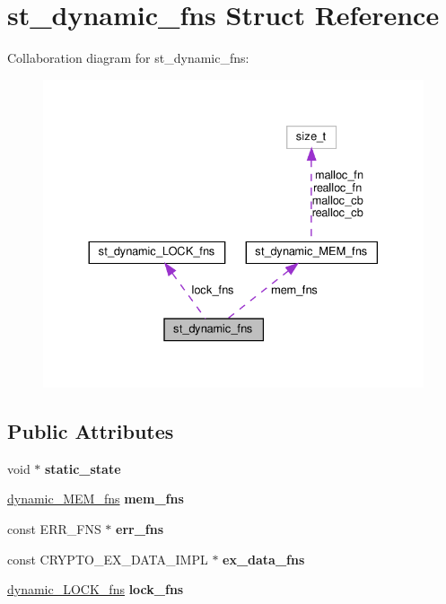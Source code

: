 \hypertarget{structst__dynamic__fns}{}\section{st\+\_\+dynamic\+\_\+fns Struct Reference}
\label{structst__dynamic__fns}


Collaboration diagram for st\+\_\+dynamic\+\_\+fns\+:
\nopagebreak
\begin{figure}[H]
\begin{center}
\leavevmode
\includegraphics[width=330pt]{structst__dynamic__fns__coll__graph}
\end{center}
\end{figure}
\subsection*{Public Attributes}
\begin{DoxyCompactItemize}
\item 
\mbox{\label{structst__dynamic__fns_a929eb1e8f7d7edbc258ee2c258f6fb77}} 
void $\ast$ {\bfseries static\+\_\+state}
\item 
\mbox{\label{structst__dynamic__fns_a337f97c16bdfd0bbe3e4432fa32b29c4}} 
\hyperlink{structst__dynamic__MEM__fns}{dynamic\+\_\+\+M\+E\+M\+\_\+fns} {\bfseries mem\+\_\+fns}
\item 
\mbox{\label{structst__dynamic__fns_a01d513d12727c5a3f86e6b7370476197}} 
const E\+R\+R\+\_\+\+F\+NS $\ast$ {\bfseries err\+\_\+fns}
\item 
\mbox{\label{structst__dynamic__fns_abf1fdf43c6222c63ea213bddd9163886}} 
const C\+R\+Y\+P\+T\+O\+\_\+\+E\+X\+\_\+\+D\+A\+T\+A\+\_\+\+I\+M\+PL $\ast$ {\bfseries ex\+\_\+data\+\_\+fns}
\item 
\mbox{\label{structst__dynamic__fns_a95857186710500c6c349a79f22ac5b05}} 
\hyperlink{structst__dynamic__LOCK__fns}{dynamic\+\_\+\+L\+O\+C\+K\+\_\+fns} {\bfseries lock\+\_\+fns}
\end{DoxyCompactItemize}


